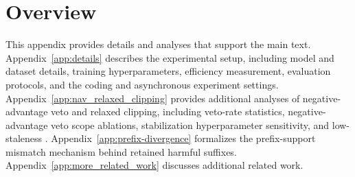 \section{Overview}
\label{app:overview}

This appendix provides details and analyses that support the main text.
Appendix~\ref{app:details} describes the experimental setup, including model and
dataset details, training hyperparameters, efficiency measurement, evaluation
protocols, and the coding and asynchronous experiment settings.
Appendix~\ref{app:nav_relaxed_clipping} provides additional analyses of negative-advantage veto and
relaxed clipping, including veto-rate statistics, negative-advantage veto scope ablations,
stabilization hyperparameter sensitivity, and low-staleness \ourmethod{}.
Appendix~\ref{app:prefix-divergence} formalizes the prefix-support mismatch
mechanism behind retained harmful suffixes.
Appendix~\ref{app:more_related_work} discusses additional related work.
